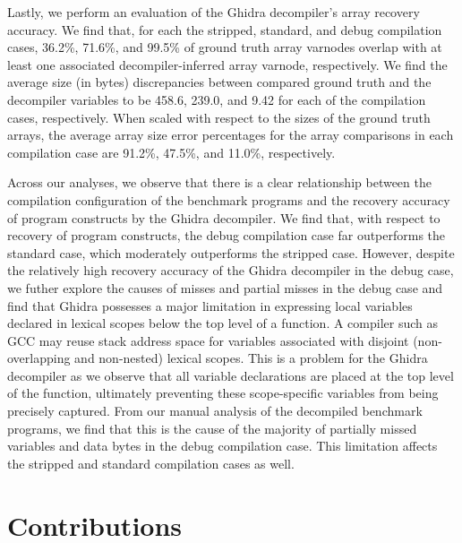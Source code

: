 Lastly, we perform an evaluation of the Ghidra decompiler's array recovery accuracy. We find that, for each the stripped, standard, and debug compilation cases, 36.2\%, 71.6\%, and 99.5\% of ground truth array varnodes overlap with at least one associated decompiler-inferred array varnode, respectively. We find the average size (in bytes) discrepancies between compared ground truth and the decompiler variables to be 458.6, 239.0, and 9.42 for each of the compilation cases, respectively. When scaled with respect to the sizes of the ground truth arrays, the average array size error percentages for the array comparisons in each compilation case are 91.2\%, 47.5\%, and 11.0\%, respectively.

Across our analyses, we observe that there is a clear relationship between the compilation configuration of the benchmark programs and the recovery accuracy of program constructs by the Ghidra decompiler. We find that, with respect to recovery of program constructs, the debug compilation case far outperforms the standard case, which moderately outperforms the stripped case. However, despite the relatively high recovery accuracy of the Ghidra decompiler in the debug case, we futher explore the causes of misses and partial misses in the debug case and find that Ghidra possesses a major limitation in expressing local variables declared in lexical scopes below the top level of a function. A compiler such as GCC may reuse stack address space for variables associated with disjoint (non-overlapping and non-nested) lexical scopes. This is a problem for the Ghidra decompiler as we observe that all variable declarations are placed at the top level of the function, ultimately preventing these scope-specific variables from being precisely captured. From our manual analysis of the decompiled benchmark programs, we find that this is the cause of the majority of partially missed variables and data bytes in the debug compilation case. This limitation affects the stripped and standard compilation cases as well.

\section{Contributions}

